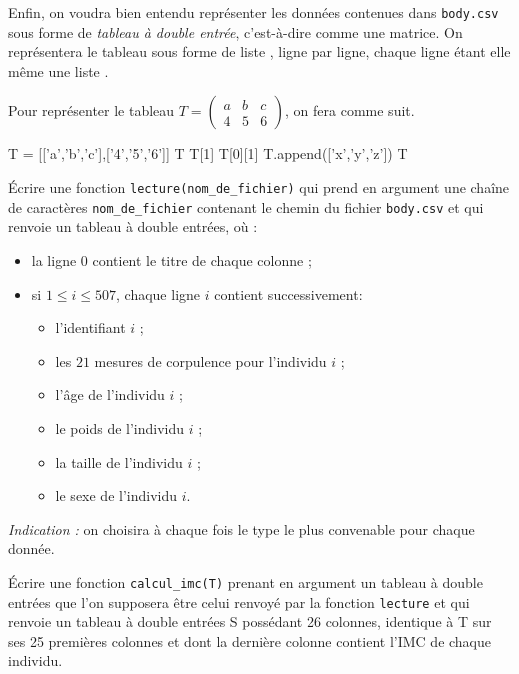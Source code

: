 Enfin, on voudra bien entendu représenter les données contenues dans \texttt{body.csv} sous forme de \emph{tableau à double entrée}, c'est-à-dire comme une matrice. On représentera le tableau sous forme de liste \python, ligne par ligne, chaque ligne étant elle même une liste \python.

\begin{ex}
  Pour représenter le tableau $T = \begin{pmatrix} a & b & c \\ 4 & 5 & 6 \end{pmatrix}$, on fera comme suit. 
\begin{pyconsole}
T = [['a','b','c'],['4','5','6']]
T
T[1]
T[0][1]
T.append(['x','y','z'])
T
\end{pyconsole}
\end{ex}


\question{} \label{qu.lecture} \'Ecrire une fonction \texttt{lecture(nom\_de\_fichier)} qui prend en argument une chaîne de caractères \texttt{nom\_de\_fichier} contenant le chemin du fichier \texttt{body.csv} et qui renvoie un tableau à double entrées, où :
\begin{itemize}
  \item[\textbullet] la ligne $0$ contient le titre de chaque colonne ;
  \item[\textbullet] si $1\leq i \leq 507$, chaque ligne $i$ contient successivement:
    \begin{itemize}
      \item l'identifiant $i$ ;
      \item les $21$ mesures de corpulence pour l'individu \no $i$ ;
      \item l'âge de l'individu \no $i$ ;
      \item le poids de l'individu \no $i$ ;
      \item la taille de l'individu \no $i$ ; 
      \item le sexe de l'individu \no $i$.
    \end{itemize}  
\end{itemize}


\emph{Indication :} on choisira à chaque fois le type le plus convenable pour chaque donnée. 

\question{}\label{qu.calcul_imc} Écrire une fonction \texttt{calcul\_imc(T)} prenant en argument un tableau à double entrées que l'on supposera être celui renvoyé par la fonction \texttt{lecture} et qui renvoie un tableau à double entrées S possédant 26 colonnes, identique à T sur ses 25 premières colonnes et dont la dernière colonne contient l'IMC de chaque individu.    

